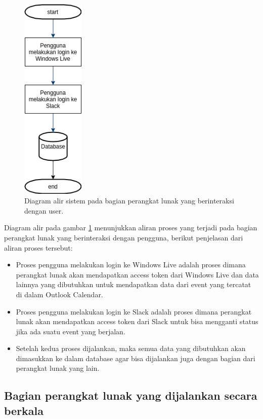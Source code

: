 \begin{figure}[h]
  \includegraphics[width=3cm]{./Gambar/workflow.png}
  \centering
  \caption{Diagram alir sistem pada bagian perangkat lunak yang berinteraksi dengan user.}
  \label{fig:workflow1}
\end{figure}

Diagram alir pada gambar \ref{fig:workflow1} menunjukkan aliran proses yang terjadi pada bagian perangkat lunak yang berinteraksi dengan pengguna, berikut penjelasan dari aliran proses tersebut:
\begin{itemize}
    \item Proses pengguna melakukan login ke Windows Live adalah proses dimana perangkat lunak akan mendapatkan access token dari Windows Live dan data lainnya yang dibutuhkan untuk mendapatkan data dari event yang tercatat di dalam Outlook Calendar. 
    \item Proses pengguna melakukan login ke Slack adalah proses dimana perangkat lunak akan mendapatkan access token dari Slack untuk bisa mengganti status jika ada suatu event yang berjalan. 
    \item Setelah kedua proses dijalankan, maka semua data yang dibutuhkan akan dimasukkan ke dalam database agar bisa dijalankan juga dengan bagian dari perangkat lunak yang lain. 
\end{itemize}
\clearpage

\subsection{Bagian perangkat lunak yang dijalankan secara berkala}

